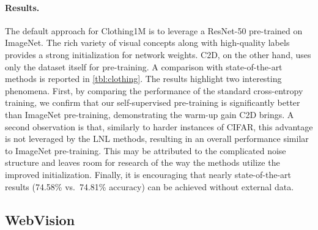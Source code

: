 \documentclass[10pt,twocolumn,letterpaper]{article}
\renewcommand{\cite}[1]{\citep{#1}}
\begin{document}
\paragraph{Results.} 

The default approach \cite{patrini2017making,tanaka2018joint,zhang2019metacleaner,li2019learning,yi2019pencil,han2019deepself,li2020dividemix,liu2020earlylearning} for Clothing1M is to leverage a ResNet-50 pre-trained on ImageNet. The rich variety of visual concepts along with high-quality labels provides a strong initialization for network weights. C2D, on the other hand, uses only the dataset itself for pre-training. 
A comparison with state-of-the-art methods is reported in \cref{tbl:clothing}. The results highlight two interesting phenomena. First, by comparing the performance of the standard cross-entropy training, we confirm that our self-supervised pre-training is significantly better than ImageNet pre-training, demonstrating the warm-up gain C2D brings. 
A second observation is that, similarly to harder instances of CIFAR, this advantage is not leveraged by the LNL methods, resulting in an overall performance similar to ImageNet pre-training. This may be attributed to the complicated noise structure and leaves room for research of the way the methods utilize the improved initialization. Finally, it is encouraging that nearly state-of-the-art results (74.58\% vs.\ 74.81\% accuracy) can be achieved without external data. 







\subsection{WebVision}
\end{document}
